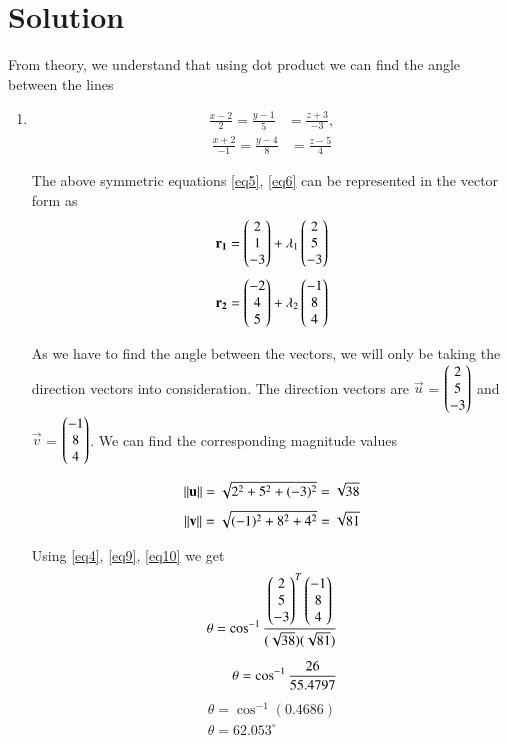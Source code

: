 \documentclass[journal,12pt,twocolumn]{IEEEtran}
\begin{document}
\section{\textbf{Solution}}
From theory, we understand that using dot product we can find the angle between the lines 
\begin{enumerate}
	\item 
	\begin{align}\label{eq5}
		\frac{x-2}{2} = \frac{y-1}{5} &= \frac{z+3}{-3}, 
	\end{align}
	\begin{align}\label{eq6}
		\frac{x+2}{-1} = \frac{y-4}{8} &= \frac{z-5}{4} 
	\end{align}


The above symmetric equations \ref{eq5}, \ref{eq6} can be represented in the vector form as 
\begin{align}\label{eq7}
	\quad \mathbf{r_1} &= \begin{pmatrix}2\\1\\-3\end{pmatrix} + \lambda_1\begin{pmatrix}2\\5\\-3\end{pmatrix}
\end{align}
\begin{align}\label{eq8}
	\quad \mathbf{r_2} &= \begin{pmatrix}-2\\4\\5\end{pmatrix} + \lambda_2\begin{pmatrix}-1\\8\\4\end{pmatrix}
\end{align}

As we have to find the angle between the vectors, we will only be taking the direction vectors into consideration. The direction vectors are $\vec{u}$ = $\begin{pmatrix}2\\5\\-3\end{pmatrix}$ and $\vec{v}$ = $\begin{pmatrix}-1\\8\\4\end{pmatrix}$. We can find the corresponding magnitude values

\begin{align}\label{eq9}
	\left\lVert\mathbf{u}\right\rVert =\sqrt{2^{2}+5^{2}+(-3)^{2}} =\sqrt{38}
\end{align}
\begin{align}\label{eq10}
	\left\lVert\mathbf{v}\right\rVert =\sqrt{(-1)^{2}+8^{2}+4^{2}} =\sqrt{81}
\end{align}

Using \ref{eq4}, \ref{eq9}, \ref{eq10} we get
\begin{align}
	\theta = \cos ^{-1}\frac{\begin{pmatrix}2\\5\\-3\end{pmatrix}^{T}\begin{pmatrix}-1\\8\\4\end{pmatrix}}{(\sqrt{38})(\sqrt{81})} 
	\\[0.2cm]
	\theta = \cos ^{-1}\frac{26}{55.4797}
\end{align}
\begin{align}
	\theta = \cos ^{-1} (0.4686)
	\\[0.2cm]
	\theta = 62.053^\circ
\end{align}


\end{enumerate}
\end{document}
